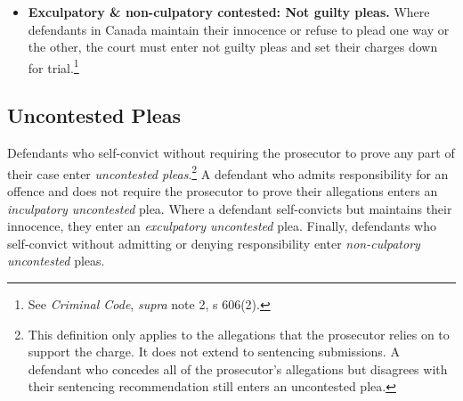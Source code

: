\begin{itemize}
    \item \textbf{Exculpatory \& non-culpatory contested: Not guilty pleas.} Where defendants in Canada maintain their innocence or refuse to plead one way or the other, the court must enter not guilty pleas and set their charges down for trial.\footnote{See \textit{Criminal Code}, \textit{supra} note 2, s 606(2).} 
    
\end{itemize}

\subsection{Uncontested Pleas}

Defendants who self-convict without requiring the prosecutor to prove any part of their case enter \textit{uncontested pleas}.\footnote{This definition only applies to the allegations that the prosecutor relies on to support the charge. It does not extend to sentencing submissions. A defendant who concedes all of the prosecutor's allegations but disagrees with their sentencing recommendation still enters an uncontested plea.} A defendant who admits responsibility for an offence and does not require the prosecutor to prove their allegations enters an \textit{inculpatory uncontested} plea. Where a defendant self-convicts but maintains their innocence, they enter an \textit{exculpatory uncontested} plea. Finally, defendants who self-convict without admitting or denying responsibility enter \textit{non-culpatory uncontested} pleas. 


